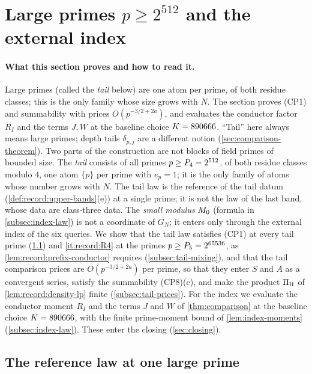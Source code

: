 \providecommand{\PushA}{\frac{5422587}{6103515625}}
\providecommand{\PushK}{890666}
\section{Large primes \texorpdfstring{$p\ge2^{512}$}{p >= 2\textasciicircum 512} and the external index}\label{sec:tail-index}

\paragraph{What this section proves and how to read it.}
Large primes (called the \emph{tail} below) are one atom per prime,
of both residue classes; this is the only family whose size grows
with $N$. The section proves (CP1) and summability with prices
$O(p^{-3/2+2a})$, and evaluates the conductor factor $R_I$ and the
terms $J,W$ at the baseline choice $\Kint=\PushK$. ``Tail'' here always means large
primes; depth tails $\delta_{p,j}$ are a different notion
(\cref{sec:comparison-theorem}).
Two parts of the construction are not blocks of field primes of bounded
size. The \emph{tail} consists of all primes $p\ge P_4=2^{512}$, of both
residue classes modulo $4$, one atom $\{p\}$ per prime with $e_p=1$; it is
the only family of atoms whose number grows with $N$. The tail law is the
reference of the tail datum (\cref{def:record:upper-bands}(e)) at a single
prime; it is not the law of the last band, whose data are class-three data.
The \emph{small modulus} $M_0$ (formula in
\cref{subsec:index-law}) is not a coordinate of $G_N$; it enters
only through the external index of the six queries. We show that the tail law satisfies
(CP1) at every tail prime (\cref{subsec:tail-law}) and \ref{it:record:R4} at
the primes $p\ge P_5=2^{65536}$, as \cref{lem:record:prefix-conductor}
requires (\cref{subsec:tail-mixing}), and that the tail comparison prices are
$O(p^{-3/2+2a})$ per prime, so that they enter $S$ and $A$ as a convergent
series, satisfy the summability (CP8)(c), and make the product $\Pi_{\rm H}$
of \cref{lem:record:density-lp} finite (\cref{subsec:tail-prices}). For the
index we evaluate the conductor moment $R_I$ and the terms $J$ and $W$ of
\cref{thm:comparison} at the baseline choice $\Kint=\PushK$, with the finite prime-moment bound
of \cref{lem:index-moments} (\cref{subsec:index-law}). These enter the closing
(\cref{sec:closing}).

\subsection{The reference law at one large prime}\label{subsec:tail-law}

